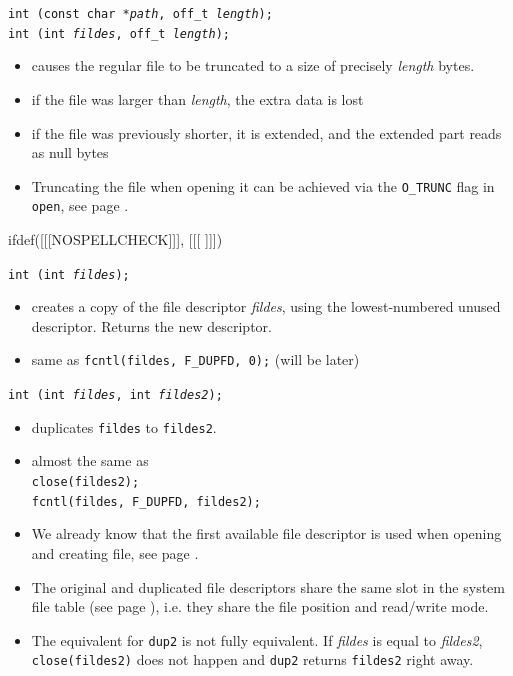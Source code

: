 \begin{slide}
\texttt{int (const char *\emph{path}, off\_t \emph{length});\\
int (int \emph{fildes}, off\_t \emph{length});}
\begin{itemize}
\item causes the regular file to be truncated to a size of precisely
\emph{length} bytes.
\item if the file was larger than \emph{length}, the extra data is lost
\item if the file was previously shorter, it is extended, and the extended part
reads as null bytes
\end{itemize}
\end{slide}

\begin{itemize}
\item Truncating the file when opening it can be achieved via the 
\texttt{O\_TRUNC} flag in \texttt{open}, see page \pageref{OPEN}.
\end{itemize}


ifdef([[[NOSPELLCHECK]]], [[[
]]])

\begin{slide}
\texttt{int (int \emph{fildes});}
\begin{itemize}
\item creates a copy of the file descriptor \emph{fildes}, using the
lowest-numbered unused descriptor.  Returns the new descriptor.
\item same as \texttt{fcntl(fildes, F\_DUPFD, 0);} (will be later)
\end{itemize}
\texttt{int (int \emph{fildes}, int \emph{fildes2});}
\begin{itemize}
\item duplicates \texttt{fildes} to \texttt{fildes2}. 
\item almost the same as\\
\texttt{close(fildes2);\\ fcntl(fildes, F\_DUPFD, fildes2);}
\end{itemize}
\end{slide}

\label{DUP_CALL}

\begin{itemize}
\item We already know that the first available file descriptor is used when
opening and creating file, see page \pageref{OPEN}.
\item The original and duplicated file descriptors share the same slot in the
system file table (see page \pageref{OPENFILETABLES}), i.e. they share the file
position and read/write mode.
\item The equivalent for \texttt{dup2} is not fully equivalent.  If
\emph{fildes} is equal to \emph{fildes2}, \texttt{close(fildes2)} does not
happen and \texttt{dup2} returns \texttt{fildes2} right away.
\end{itemize}

